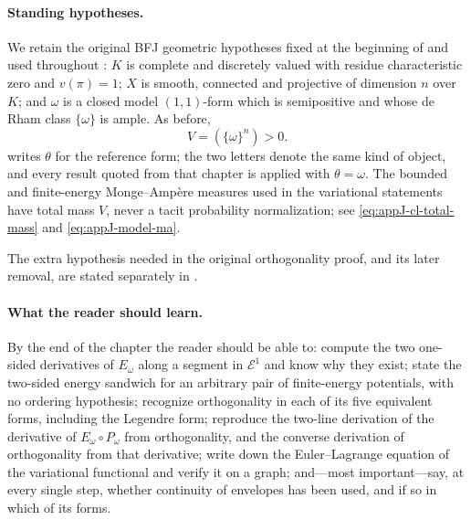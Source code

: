 \paragraph{Standing hypotheses.}
We retain the original BFJ geometric hypotheses fixed at the beginning of
 and used throughout
:
$K$ is complete and discretely valued with residue characteristic zero and
$v(\pi)=1$; $X$ is smooth, connected and projective of dimension $n$
over $K$; and $\omega$ is a closed model $(1,1)$-form which is
semipositive and whose de Rham class $\{\omega\}$ is ample.  As before,
\[
                         V=(\{\omega\}^n)>0 .
\]
 writes $\theta$ for the reference form; the two
letters denote the same kind of object, and every result quoted from that
chapter is applied with $\theta=\omega$.  The bounded and finite-energy
Monge--Amp\`ere measures used in the variational statements have total mass
$V$, never a tacit probability normalization; see
\eqref{eq:appJ-cl-total-mass} and \eqref{eq:appJ-model-ma}.

The extra hypothesis needed in the original orthogonality proof, and its
later removal, are stated separately in
.

\paragraph{What the reader should learn.}
By the end of the chapter the reader should be able to: compute the two
one-sided derivatives of $E_\omega$ along a segment in $\mathcal E^1$ and
know why they exist; state the two-sided energy sandwich for an arbitrary
pair of finite-energy potentials, with no ordering hypothesis; recognize
orthogonality in each of its five equivalent forms, including the Legendre
form; reproduce the two-line derivation of the derivative of
$E_\omega\circ P_\omega$ from orthogonality, and the converse derivation of
orthogonality from that derivative; write down the Euler--Lagrange equation
of the variational functional and verify it on a graph; and---most
important---say, at every single step, whether continuity of envelopes has
been used, and if so in which of its forms.

